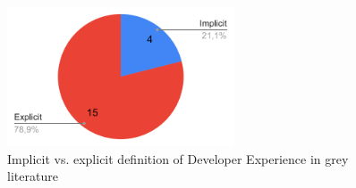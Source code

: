 \documentclass[english, 12pt, a4paper, sci, utf8, a-1b, online]{aaltothesis}
\begin{document}
\begin{figure}[ht]
  \begin{center}
    \includegraphics[width=0.6\textwidth]{definition-grey.pdf}
    \captionsetup{width=0.6\textwidth}
    \caption{Implicit vs. explicit definition of Developer Experience in grey literature}
  \end{center}
\end{figure}
\end{document}
